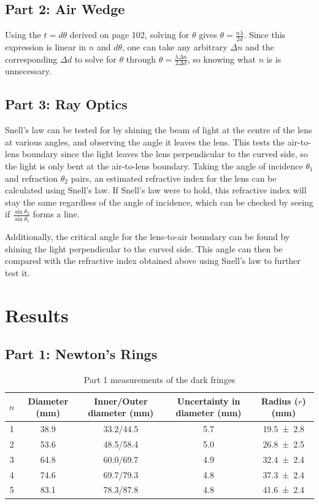 \documentclass[a4paper]{scrartcl}
\begin{document}
\subsection{Part 2: Air Wedge}
Using the \(t = d \theta\) derived on page 102, solving for \(\theta\) gives \(\theta = \frac{n \lambda}{2 d}\). Since this expression is linear in \(n\) and \(d \theta\), one can take any arbitrary \(\Delta n\) and the corresponding \(\Delta d\) to solve for \(\theta\) through \(\theta = \frac{\lambda \Delta n}{2 \Delta d}\), so knowing what \(n\) is is unnecessary.

\subsection{Part 3: Ray Optics}
Snell's law can be tested for by shining the beam of light at the centre of the lens at various angles, and observing the angle it leaves the lens. This tests the air-to-lens boundary since the light leaves the lens perpendicular to the curved side, so the light is only bent at the air-to-lens boundary. Taking the angle of incidence \(\theta_1\) and refraction \(\theta_2\) pairs, an estimated refractive index for the lens can be calculated using Snell's law. If Snell's law were to hold, this refractive index will stay the same regardless of the angle of incidence, which can be checked by seeing if \(\frac{\sin\theta_2}{\sin\theta_1}\) forms a line.

Additionally, the critical angle for the lens-to-air boundary can be found by shining the light perpendicular to the curved side. This angle can then be compared with the refractive index obtained above using Snell's law to further test it.

\section{Results}
\subsection{Part 1: Newton's Rings}
\begin{table}
    \centering
    \begin{tabular}{c | c | c | c | c}
        \(n\) & Diameter (\si{\milli\metre}) & Inner/Outer diameter (\si{\milli\metre}) & Uncertainty in diameter (\si{\milli\metre}) & Radius (\(r\)) (\si{\milli\metre}) \\
        \hline
        1 & 38.9 & 33.2/44.5 & 5.7 & \SI{19.5 \pm 2.8}{} \\
        2 & 53.6 & 48.5/58.4 & 5.0 & \SI{26.8 \pm 2.5}{} \\
        3 & 64.8 & 60.0/69.7 & 4.9 & \SI{32.4 \pm 2.4}{} \\
        4 & 74.6 & 69.7/79.3 & 4.8 & \SI{37.3 \pm 2.4}{} \\
        5 & 83.1 & 78.3/87.8 & 4.8 & \SI{41.6 \pm 2.4}{} \\
        \hline
    \end{tabular}
    \caption{Part 1 measurements of the dark fringes}
    \label{tab:part1_data}
\end{table}
\end{document}
